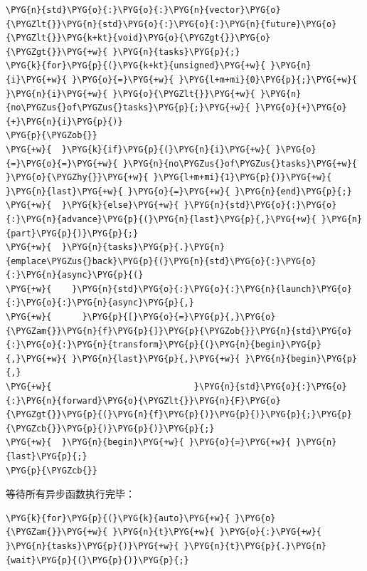 \begin{codeblockbg}
\begin{Verbatim}[commandchars=\\\{\},breaklines=true,breakanywhere=true,fontsize=\codefont,xleftmargin=17bp]
\PYG{n}{std}\PYG{o}{:}\PYG{o}{:}\PYG{n}{vector}\PYG{o}{\PYGZlt{}}\PYG{n}{std}\PYG{o}{:}\PYG{o}{:}\PYG{n}{future}\PYG{o}{\PYGZlt{}}\PYG{k+kt}{void}\PYG{o}{\PYGZgt{}}\PYG{o}{\PYGZgt{}}\PYG{+w}{ }\PYG{n}{tasks}\PYG{p}{;}
\PYG{k}{for}\PYG{p}{(}\PYG{k+kt}{unsigned}\PYG{+w}{ }\PYG{n}{i}\PYG{+w}{ }\PYG{o}{=}\PYG{+w}{ }\PYG{l+m+mi}{0}\PYG{p}{;}\PYG{+w}{ }\PYG{n}{i}\PYG{+w}{ }\PYG{o}{\PYGZlt{}}\PYG{+w}{ }\PYG{n}{no\PYGZus{}of\PYGZus{}tasks}\PYG{p}{;}\PYG{+w}{ }\PYG{o}{+}\PYG{o}{+}\PYG{n}{i}\PYG{p}{)}
\PYG{p}{\PYGZob{}}
\PYG{+w}{  }\PYG{k}{if}\PYG{p}{(}\PYG{n}{i}\PYG{+w}{ }\PYG{o}{=}\PYG{o}{=}\PYG{+w}{ }\PYG{n}{no\PYGZus{}of\PYGZus{}tasks}\PYG{+w}{ }\PYG{o}{\PYGZhy{}}\PYG{+w}{ }\PYG{l+m+mi}{1}\PYG{p}{)}\PYG{+w}{ }\PYG{n}{last}\PYG{+w}{ }\PYG{o}{=}\PYG{+w}{ }\PYG{n}{end}\PYG{p}{;}
\PYG{+w}{  }\PYG{k}{else}\PYG{+w}{ }\PYG{n}{std}\PYG{o}{:}\PYG{o}{:}\PYG{n}{advance}\PYG{p}{(}\PYG{n}{last}\PYG{p}{,}\PYG{+w}{ }\PYG{n}{part}\PYG{p}{)}\PYG{p}{;}
\PYG{+w}{  }\PYG{n}{tasks}\PYG{p}{.}\PYG{n}{emplace\PYGZus{}back}\PYG{p}{(}\PYG{n}{std}\PYG{o}{:}\PYG{o}{:}\PYG{n}{async}\PYG{p}{(}
\PYG{+w}{    }\PYG{n}{std}\PYG{o}{:}\PYG{o}{:}\PYG{n}{launch}\PYG{o}{:}\PYG{o}{:}\PYG{n}{async}\PYG{p}{,}
\PYG{+w}{      }\PYG{p}{[}\PYG{o}{=}\PYG{p}{,}\PYG{o}{\PYGZam{}}\PYG{n}{f}\PYG{p}{]}\PYG{p}{\PYGZob{}}\PYG{n}{std}\PYG{o}{:}\PYG{o}{:}\PYG{n}{transform}\PYG{p}{(}\PYG{n}{begin}\PYG{p}{,}\PYG{+w}{ }\PYG{n}{last}\PYG{p}{,}\PYG{+w}{ }\PYG{n}{begin}\PYG{p}{,}
\PYG{+w}{                            }\PYG{n}{std}\PYG{o}{:}\PYG{o}{:}\PYG{n}{forward}\PYG{o}{\PYGZlt{}}\PYG{n}{F}\PYG{o}{\PYGZgt{}}\PYG{p}{(}\PYG{n}{f}\PYG{p}{)}\PYG{p}{)}\PYG{p}{;}\PYG{p}{\PYGZcb{}}\PYG{p}{)}\PYG{p}{)}\PYG{p}{;}
\PYG{+w}{  }\PYG{n}{begin}\PYG{+w}{ }\PYG{o}{=}\PYG{+w}{ }\PYG{n}{last}\PYG{p}{;}
\PYG{p}{\PYGZcb{}}
\end{Verbatim}
\end{codeblockbg}



等待所有异步函数执行完毕：



\begin{codeblockbg}
\begin{Verbatim}[commandchars=\\\{\},breaklines=true,breakanywhere=true,fontsize=\codefont,xleftmargin=17bp]
\PYG{k}{for}\PYG{p}{(}\PYG{k}{auto}\PYG{+w}{ }\PYG{o}{\PYGZam{}}\PYG{+w}{ }\PYG{n}{t}\PYG{+w}{ }\PYG{o}{:}\PYG{+w}{ }\PYG{n}{tasks}\PYG{p}{)}\PYG{+w}{ }\PYG{n}{t}\PYG{p}{.}\PYG{n}{wait}\PYG{p}{(}\PYG{p}{)}\PYG{p}{;}
\end{Verbatim}
\end{codeblockbg}


